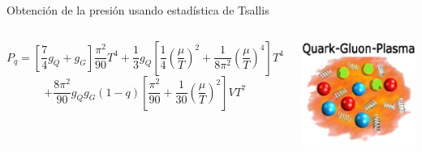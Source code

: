 \documentclass{beamer}
\begin{document}
\begin{frame}{Obtención de la presión usando estadística de Tsallis}
\begin{columns}
{\begin{itemize}
        \[
          P_q = \left[ \frac{7}{4} g_Q + g_G \right] \frac{\pi^2}{90} T^4 + 
          \frac{1}{3} g_Q \left[ \frac{1}{4} \left( \frac{\mu}{T} \right)^2 +
          \frac{1}{8\pi^2} \left( \frac{\mu}{T} \right)^4 \right] T^4
        \]
        \[
          + \frac{8\pi^2}{90} g_Q g_G (1 - q) \left[ \frac{\pi^2}{90} +
          \frac{1}{30} \left( \frac{\mu}{T} \right)^2 \right] VT^7
        \]
      \end{itemize}
    }

    \centering
    \vspace{2cm}
    \includegraphics[width=0.9\linewidth]{figures/QG-plasma.png} %
  \end{columns}
\end{frame}

\end{document}
